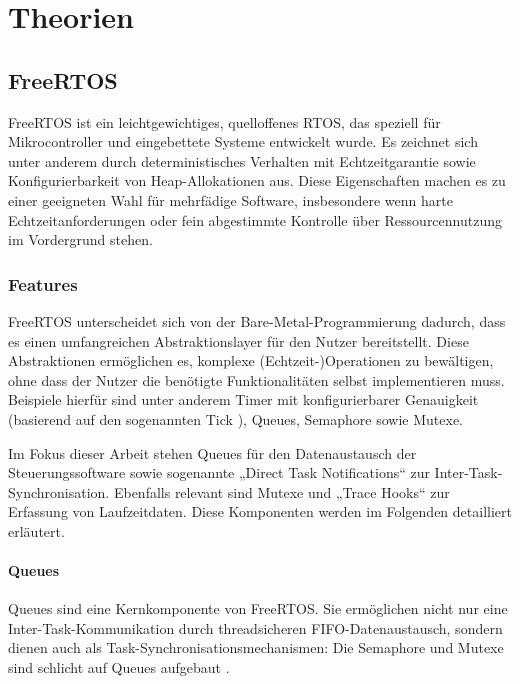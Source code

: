 \section{Theorien}

\subsection{FreeRTOS}

FreeRTOS ist ein leichtgewichtiges, quelloffenes RTOS, das speziell für
Mikrocontroller und eingebettete Systeme entwickelt wurde. Es zeichnet sich
unter anderem durch deterministisches Verhalten mit Echtzeitgarantie sowie
Konfigurierbarkeit von Heap-Allokationen aus. Diese Eigenschaften machen es zu
einer geeigneten Wahl für mehrfädige Software, insbesondere wenn harte
Echtzeitanforderungen oder fein abgestimmte Kontrolle über Ressourcennutzung im
Vordergrund stehen.

\subsubsection{Features}

FreeRTOS unterscheidet sich von der Bare-Metal-Programmierung dadurch, dass es
einen umfangreichen Abstraktionslayer für den Nutzer bereitstellt. Diese
Abstraktionen ermöglichen es, komplexe (Echtzeit-)Operationen zu bewältigen,
ohne dass der Nutzer die benötigte Funktionalitäten selbst implementieren muss.
Beispiele hierfür sind unter anderem Timer mit konfigurierbarer Genauigkeit
(basierend auf den sogenannten Tick \cite{freertos_rtos_tick}), Queues,
Semaphore sowie Mutexe.

Im Fokus dieser Arbeit stehen Queues für den Datenaustausch der
Steuerungssoftware sowie sogenannte „Direct Task Notifications“ zur
Inter-Task-Synchronisation. Ebenfalls relevant sind Mutexe und „Trace Hooks“ zur
Erfassung von Laufzeitdaten. Diese Komponenten werden im Folgenden detailliert
erläutert.

\paragraph{Queues}

Queues sind eine Kernkomponente von FreeRTOS. Sie ermöglichen nicht nur eine
Inter-Task-Kommunikation durch threadsicheren FIFO-Datenaustausch, sondern
dienen auch als Task-Synchronisationsmechanismen: Die Semaphore und Mutexe sind
schlicht auf Queues aufgebaut \cite{freertos_semphr_incl}.

